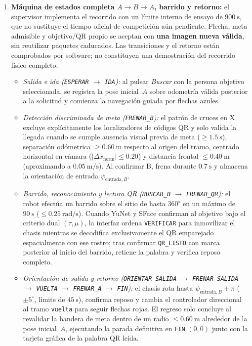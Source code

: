 \documentclass[11pt,a4paper]{article}
\begin{document}
\begin{enumerate}
  \item \textbf{Máquina de estados completa $A \rightarrow B \rightarrow A$,
  barrido y retorno:} el supervisor implementa el recorrido con un límite
  interno de ensayo de $900\ \mathrm{s}$, que no sustituye el tiempo oficial
  de competición aún pendiente. Flecha, meta admisible y objetivo/QR propio se
  aceptan con \textbf{una imagen nueva válida}, sin reutilizar paquetes caducados.
  Las transiciones y el retorno están comprobados por software; no constituyen
  una demostración del recorrido físico completo:
  \begin{itemize}
    \item \emph{Salida e ida (\texttt{ESPERAR} $\rightarrow$ \texttt{IDA}):}
    al pulsar \emph{Buscar} con la persona objetivo seleccionada, se registra la
    pose inicial~$A$ sobre odometría válida posterior a la solicitud y comienza
    la navegación guiada por flechas azules.
    \item \emph{Detección discriminada de meta (\texttt{FRENAR\_B}):} el
    patrón de cruces en X excluye explícitamente los localizadores de códigos QR
    y solo valida la llegada cuando se cumple ausencia visual previa de meta
    ($\ge 1.5\ \mathrm{s}$), separación odómetrica $\ge 0.60\ \mathrm{m}$ respecto
    al origen del tramo, centrado horizontal en cámara ($|\Delta x_{\mathrm{norm}}|
    \le 0.20$) y distancia frontal $\le 0.40\ \mathrm{m}$ (aproximando a
    $0.05\ \mathrm{m/s}$). Al confirmar B, frena durante $0.7\ \mathrm{s}$ y
    almacena la orientación de entrada $\psi_{\mathrm{entrada},B}$.
    \item \emph{Barrido, reconocimiento y lectura QR (\texttt{BUSCAR\_B}
    $\rightarrow$ \texttt{FRENAR\_QR}):} el robot efectúa un barrido sobre el
    sitio de hasta $360^\circ$ en un máximo de $90\ \mathrm{s}$ ($\le 0.25\ \mathrm{rad/s}$).
    Cuando YuNet y SFace confirman al objetivo bajo el criterio dual
    $(\tau, \mu)$, la interfaz ordena \texttt{VERIFICAR} para inmovilizar el
    chasis mientras se decodifica exclusivamente el QR emparejado espacialmente
    con ese rostro; tras confirmar \texttt{QR\_LISTO} con marca posterior al
    inicio del barrido, retiene la palabra y verifica reposo completo.
    \item \emph{Orientación de salida y retorno (\texttt{ORIENTAR\_SALIDA}
    $\rightarrow$ \texttt{FRENAR\_SALIDA} $\rightarrow$ \texttt{VUELTA}
    $\rightarrow$ \texttt{FRENAR\_A} $\rightarrow$ \texttt{FIN}):} el chasis
    rota hasta $\psi_{\mathrm{entrada},B} + \pi$ ($\pm 5^\circ$, límite de
    $45\ \mathrm{s}$), confirma reposo y cambia el controlador direccional al
    tramo \texttt{vuelta} para seguir flechas rojas. El regreso solo concluye al
    revalidar la bandera de meta dentro de un radio $\le 0.60\ \mathrm{m}$
    alrededor de la pose inicial~$A$, ejecutando la parada definitiva en
    \texttt{FIN} $(0,0)$ junto con la tarjeta gráfica de la palabra QR leída.
  \end{itemize}
\end{enumerate}
\end{document}
